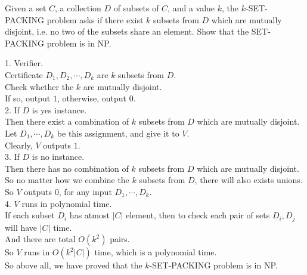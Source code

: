 \problem{}
Given a set $C$, a collection $D$ of subsets of $C$, and a value $k$, the $k$-SET-PACKING problem asks if there exist $k$ subsets from $D$ which are mutually disjoint, i.e. no two of the subsets share an element.  Show that the SET-PACKING problem is in NP.

\solution{}

1. Verifier. \\
Certificate $D_1,D_2,\cdots,D_k$ are $k$ subsets from $D$.\\
Check whether the $k$ are mutually disjoint.\\
If so, output $1$, otherwise, output $0$.\\

2. If $D$ is yes instance. \\
Then there exist a combination of $k$ subsets from $D$ which are mutually disjoint.\\
Let $D_1,\cdots,D_k$ be this assignment, and give it to $V$.\\
Clearly, $V$ outputs $1$.\\

3. If $D$ is no instance. \\
Then there has no combination of $k$ subsets from $D$ which are mutually disjoint.\\
So no matter how we combine the $k$ subsets from $D$, there will also exists unions.\\
So $V$ outputs $0$, for any input $D_1,\cdots,D_k$.\\

4. $V$ runs in polynomial time. \\
If each subset $D_i$ has atmost $|C|$ element, then to check each pair of sets $D_i,D_j$ will have $|C|$ time.\\
And there are total $O(k^2)$ pairs.\\
So $V$ runs in $O(k^2|C|)$ time, which is a polynomial time.\\

So above all, we have proved that the $k$-SET-PACKING problem is in NP.

\newpage
